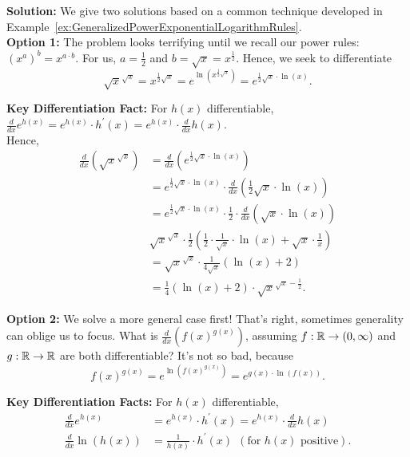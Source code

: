 \textbf{Solution:} We give two solutions based on a common technique developed in Example~\ref{ex:GeneralizedPowerExponentialLogarithmRules}.\\

\textbf{Option 1:} The problem looks terrifying until we recall our power rules: $\left(x^a\right)^b = x^{a \cdot b}$. For us, $a = \frac{1}{2}$ and $b = \sqrt{x} = x^{\frac{1}{2}}$. Hence, we seek to differentiate 
$$ \sqrt{x}^{\sqrt{x}} = x^{\frac{1}{2} \sqrt{x}} = e^{\ln\left( x^{\frac{1}{2} \sqrt{x}} \right)} =  e^{\frac{1}{2} \sqrt{x} \cdot \ln\left( x \right)}.$$

\textbf{Key Differentiation Fact:} For $h(x)$ differentiable, $\frac{d}{dx} e^{h(x)} =  e^{h(x)} \cdot h^\prime(x) =  e^{h(x)} \cdot \frac{d}{dx} h(x)$.\\

Hence, 
\begin{align*}
    \frac{d}{dx}\left( \sqrt{x}^{\sqrt{x}} \right) &= \frac{d}{dx}\left(   e^{\frac{1}{2} \sqrt{x} \cdot \ln\left( x \right)}\right)\\[1em]
    & =  e^{ \frac{1}{2} \sqrt{x} \cdot \ln\left( x \right) } \cdot \frac{d}{dx} \left( \frac{1}{2} \sqrt{x} \cdot \ln\left( x \right) \right) \\[1em]
    &= e^{ \frac{1}{2} \sqrt{x} \cdot \ln\left( x \right) } \cdot \frac{1}{2} \cdot\frac{d}{dx} \left(  \sqrt{x} \cdot \ln\left( x \right) \right) \\[1em]
    & \sqrt{x}^{\sqrt{x}} \cdot \frac{1}{2} \left(  \frac{1}{2} \cdot \frac{1}{\sqrt{x}} \cdot \ln(x) + \sqrt{x} \cdot \frac{1}{x} \right) \\[1em]
    & = \sqrt{x}^{\sqrt{x}} \cdot \frac{1}{4 \sqrt{x}} \left(  \ln(x) + 2\right)\\[1em]
    &  = \frac{1}{4} \left( \ln(x) + 2 \right) \cdot \sqrt{x}^{\sqrt{x} - \frac{1}{2}}.
\end{align*}

\textbf{Option 2:} We solve a more general case first! That's right, sometimes generality can oblige us to focus. What is $\frac{d}{dx}\left( f(x)^{g(x)} \right)$, assuming $f:\mathbb R \to (0, \infty)$ and $g:\mathbb R \to \mathbb R$ are both differentiable? It's not so bad, because
$$  f(x)^{g(x)} = e^{\ln\left(  f(x)^{g(x)}\right)} = e^{g(x) \cdot \ln(f(x))}.$$

\textbf{Key Differentiation Facts:} For $h(x)$ differentiable,
\begin{align*}
    \frac{d}{dx} e^{h(x)} &=  e^{h(x)} \cdot h^\prime(x) =  e^{h(x)} \cdot \frac{d}{dx} h(x) \\
    \frac{d}{dx} \ln(h(x)) &= \frac{1}{h(x)} \cdot h^\prime(x) ~~(\text{for $h(x)$ positive}).
\end{align*}

